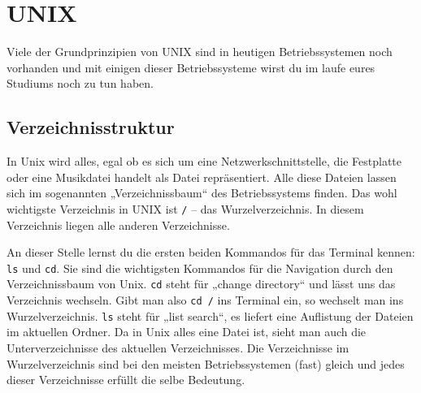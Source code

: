 \chapter{UNIX}

\lstset{language=bash}
Viele der Grundprinzipien von UNIX sind in heutigen Betriebssystemen noch vorhanden und mit einigen dieser Betriebssysteme wirst du im laufe eures Studiums noch zu tun haben.

\section{Verzeichnisstruktur}
In Unix wird alles, egal ob es sich um eine Netzwerkschnittstelle, die Festplatte oder eine Musikdatei handelt als Datei repräsentiert. Alle diese Dateien lassen sich im sogenannten „Verzeichnissbaum“ des Betriebssystems finden. Das wohl wichtigste Verzeichnis in UNIX ist \lstinline$/$ – das Wurzelverzeichnis. In diesem Verzeichnis liegen alle anderen Verzeichnisse.

An dieser Stelle lernst du die ersten beiden Kommandos für das Terminal kennen: \lstinline$ls$ und \lstinline$cd$.
Sie sind die wichtigsten Kommandos für die Navigation durch den Verzeichnissbaum von Unix. \lstinline$cd$ steht für „change directory“ und lässt uns das Verzeichnis wechseln. Gibt man also \lstinline$cd /$ ins Terminal ein, so wechselt man ins Wurzelverzeichnis. \lstinline$ls$ steht für „list search“, es liefert eine Auflistung der Dateien im aktuellen Ordner.
Da in Unix alles eine Datei ist, sieht man auch die Unterverzeichnisse des aktuellen Verzeichnisses.
Die Verzeichnisse im Wurzelverzeichnis sind bei den meisten Betriebssystemen (fast) gleich und jedes dieser Verzeichnisse erfüllt die selbe Bedeutung.

